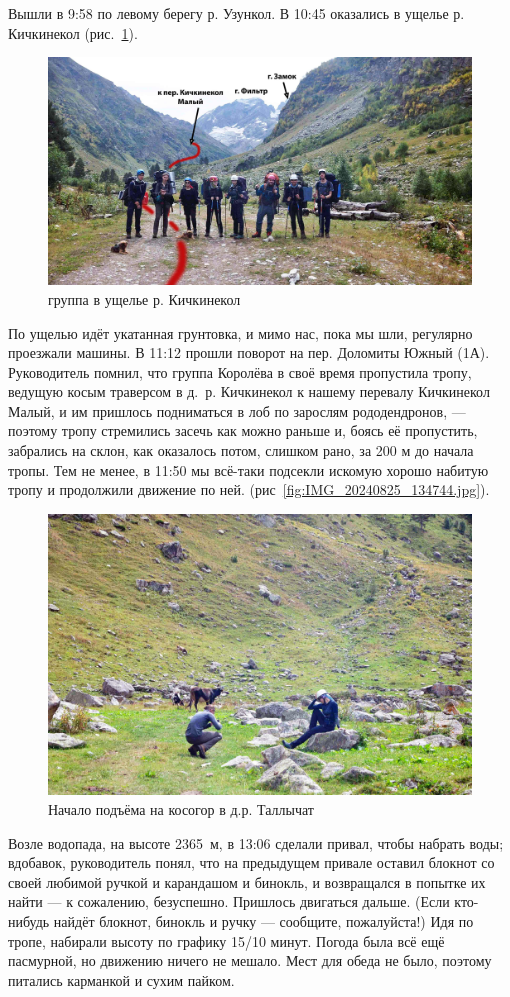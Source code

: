 Вышли в 9:58 по левому берегу р. Узункол. В 10:45 оказались в ущелье р. Кичкинекол (рис.~\ref{fig:DSC_0127.JPG}). 

\begin{figure}[h!]
	\centering
	\includegraphics[width=0.7\linewidth]{../pics/DSC_0127.jpg}
	\caption{группа в ущелье р. Кичкинекол}
	\label{fig:DSC_0127.JPG}
\end{figure}


По ущелью идёт укатанная грунтовка, и мимо нас, пока мы шли, регулярно проезжали машины. В 11:12 прошли поворот на пер. Доломиты Южный (1А). Руководитель помнил, что группа Королёва \cite{Korolyov2018} в своё время пропустила тропу, ведущую косым траверсом в д.~р. Кичкинекол к нашему перевалу Кичкинекол Малый, и им пришлось подниматься в лоб по зарослям рододендронов, --- поэтому тропу стремились засечь как можно раньше и, боясь её пропустить, забрались на склон, как оказалось потом, слишком рано, за 200 м до начала тропы. Тем не менее, в 11:50 мы всё-таки подсекли искомую хорошо набитую тропу и продолжили движение по ней. (рис~\ref{fig:IMG_20240825_134744.jpg}).  
	
	\begin{figure}[h!]
		\centering
		\includegraphics[width=0.7\linewidth]{../pics/DSC_0138.jpg}
		\caption{Начало подъёма на косогор в д.р. Таллычат}
		\label{fig:DSC_0138.JPG}
	\end{figure}
	
Возле водопада, на высоте 2365~м, в 13:06 сделали привал, чтобы набрать воды; вдобавок, руководитель понял, что на предыдущем привале оставил блокнот со своей любимой ручкой и карандашом и бинокль, и возвращался в попытке их найти --- к сожалению, безуспешно. Пришлось двигаться дальше. (Если кто-нибудь найдёт блокнот, бинокль и ручку --- сообщите, пожалуйста!) Идя по тропе, набирали высоту по графику 15/10 минут. Погода была всё ещё пасмурной, но движению ничего не мешало. Мест для обеда не было, поэтому питались карманкой и сухим пайком.

